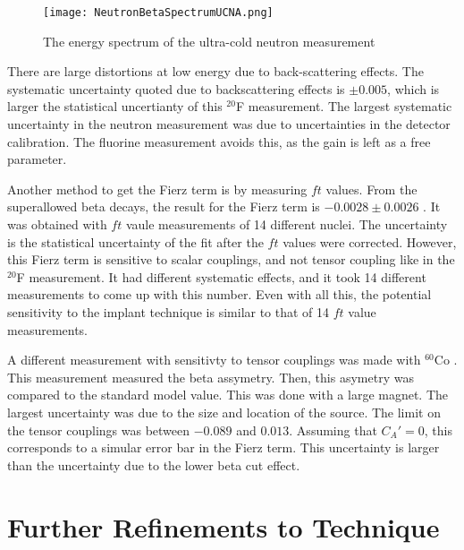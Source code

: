 \documentclass[main.tex]{subfiles}
\begin{document}
\begin{figure}[!htb]
	\centerline{\texttt{[image: NeutronBetaSpectrumUCNA.png]}}
	\caption{The energy spectrum of the ultra-cold neutron measurement \cite{Hic17}}
	\label{fig:ucnabeta}
\end{figure}

There are large distortions at low energy due to back-scattering effects. 
The systematic uncertainty quoted due to backscattering effects is $\pm 0.005$, which is larger the statistical uncertianty of this $^{20}$F measurement.
The largest systematic uncertainty in the neutron measurement was due to uncertainties in the detector calibration.
The fluorine measurement avoids this, as the gain is left as a free parameter.

Another method to get the Fierz term is by measuring $ft$ values.
From the superallowed beta decays, the result for the Fierz term is $-0.0028 \pm 0.0026$ \cite{Har17}.
It was obtained with $ft$ vaule measurements of 14 different nuclei. 
The uncertainty is the statistical uncertainty of the fit after the $ft$ values were corrected.
However, this Fierz term is sensitive to scalar couplings, and not tensor coupling like in the $^{20}$F measurement.
It had different systematic effects, and it took 14 different measurements to come up with this number.
Even with all this, the potential sensitivity to the implant technique is similar to that of 14 $ft$ value measurements.

A different measurement with sensitivty to tensor couplings was made with $^{60}$Co \cite{Wau10}.
This measurement measured the beta assymetry.
Then, this asymetry was compared to the standard model value.
This was done with a large magnet. 
The largest uncertainty was due to the size and location of the source.
The limit on the tensor couplings was between $-0.089$ and $0.013$.
Assuming that $C_{A}' = 0$, this corresponds to a simular error bar in the Fierz term.
This uncertainty is larger than the uncertainty due to the lower beta cut effect.

\section{Further Refinements to Technique}
\end{document}
